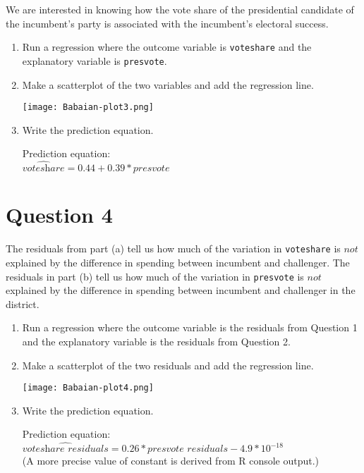 \documentclass[12pt,letterpaper]{article}
\begin{document}
\noindent We are interested in knowing how the vote share of the presidential candidate of the incumbent's party is associated with the incumbent's electoral success.
	\vspace{.25cm}
	\begin{enumerate}
		\item Run a regression where the outcome variable is \texttt{voteshare} and the explanatory variable is \texttt{presvote}.
			\vspace{.2cm}
			\vspace{.2cm}
			  
		\item Make a scatterplot of the two variables and add the regression line. 
		\vspace{.2cm}
		  
			\vspace{.2cm}
			\begin{center}
				\texttt{[image: Babaian-plot3.png]}
				\end{center}
		\item Write the prediction equation.
			  
			
		Prediction equation: \\
		$\widehat{\textit{voteshare}} = 0.44 + 0.39*\textit{presvote}$
	\end{enumerate}
	

\newpage	
\section*{Question 4}
\noindent The residuals from part (a) tell us how much of the variation in \texttt{voteshare} is $not$ explained by the difference in spending between incumbent and challenger. The residuals in part (b) tell us how much of the variation in \texttt{presvote} is $not$ explained by the difference in spending between incumbent and challenger in the district.
	\begin{enumerate}
		\item Run a regression where the outcome variable is the residuals from Question 1 and the explanatory variable is the residuals from Question 2.	
			  
		\item Make a scatterplot of the two residuals and add the regression line. 	\vspace{.2cm}
					  
					\begin{center}
						\texttt{[image: Babaian-plot4.png]}
						\end{center}
		\item Write the prediction equation.
							  
				
			Prediction equation: \\
			$\widehat{\textit{voteshare residuals}} = 0.26*\textit{presvote residuals} - 4.9*10^{-18}$	\\
			(A more precise value of constant is derived from R console output.)			
	\end{enumerate}
	
\end{document}
